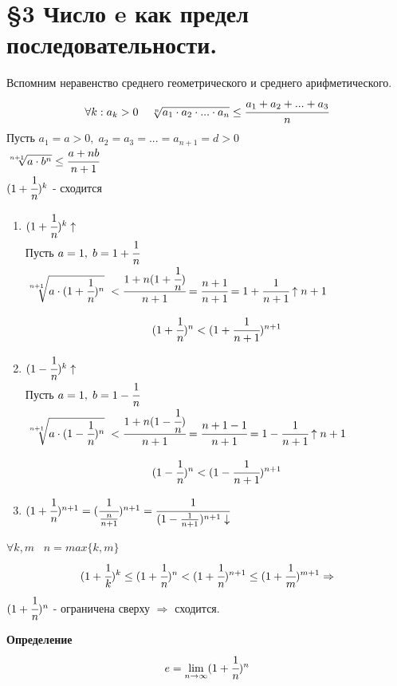 \documentclass[12pt, a4paper]{article}
\begin{document}
\section{\S 3 Число e как предел последовательности.}
Вспомним неравенство среднего геометрического и среднего арифметического.
\[\forall k: a_k>0\;\;\;\ \sqrt[n]{a_1\cdot a_2\cdot ... \cdot a_n} \leq \cfrac{a_1+a_2+...+a_3}{n} \]
Пусть $a_1 = a > 0,\;a_2=a_3=...=a_{n+1}=d>0$\\
$\sqrt[n+1]{a\cdot b^n} \leq \cfrac{a+nb}{n+1}$\\
$(1+\cfrac{1}{n})^k$ - сходится
\begin{tcolorbox}[title=Доказательства монотонности]
    \begin{enumerate}
        \item $(1+\cfrac{1}{n})^k \uparrow$\\
        Пусть $a = 1,\;b=1+\cfrac{1}{n}$\\
        $\sqrt[n+1]{a\cdot(1+\cfrac{1}{n})^n}\; < \cfrac{1+n(1+\cfrac{1}{n})}{n+1} = \cfrac{n+1}{n+1} = 1+\cfrac{1}{n+1} \uparrow n+1 $
        \begin{tcolorbox}
            \[ (1+\cfrac{1}{n})^n < (1+\cfrac{1}{n+1})^{n+1} \]
        \end{tcolorbox}
        \item $(1-\cfrac{1}{n})^k \uparrow$\\
        Пусть $a = 1,\;b=1-\cfrac{1}{n}$\\
        $\sqrt[n+1]{a\cdot(1-\cfrac{1}{n})^n}\; < \cfrac{1+n(1-\cfrac{1}{n})}{n+1} = \cfrac{n+1-1}{n+1} = 1-\cfrac{1}{n+1} \uparrow n+1 $
        \begin{tcolorbox}
            \[ (1-\cfrac{1}{n})^n < (1-\cfrac{1}{n+1})^{n+1} \]    
        \end{tcolorbox}
        \item $(1+\cfrac{1}{n})^{n+1} = (\cfrac{1}{\frac{n}{n+1}})^{n+1} = \cfrac{1}{(1-\frac{1}{n+1})^{n+1} \downarrow } $
    \end{enumerate}
\end{tcolorbox}
$\forall k,m \;\;\; n=max\{k,m\}$\\
\[ (1+\cfrac{1}{k})^k \leq (1+\cfrac{1}{n})^n < (1+\cfrac{1}{n})^{n+1} \leq (1+\cfrac{1}{m})^{m+1} \Rightarrow \]
$(1+\cfrac{1}{n})^n$ - ограничена сверху $\Rightarrow$ сходится.

\begin{tcolorbox}
    \textbf{Определение} 
    \[e = \lim_{n\to \infty} (1+\cfrac{1}{n})^n \]
\end{tcolorbox}
\end{document}
